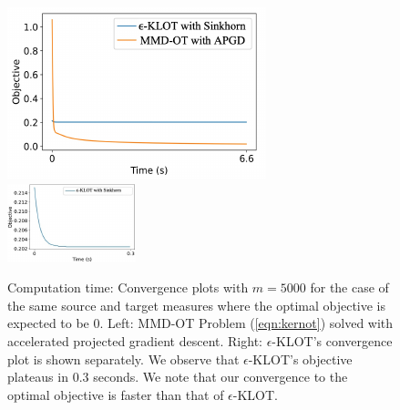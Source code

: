 \begin{figure}[t]
    \centering \includegraphics[width=0.47\linewidth]{chapter-1/images/synth3.pdf}\includegraphics[width=0.5\linewidth]{chapter-1/images/time.pdf}
    \caption{Computation time: Convergence plots with $m=5000$ for the case of the same source and target measures where the optimal objective is expected to be 0. Left: MMD-OT Problem (\ref{eqn:kernot}) solved with accelerated projected gradient descent. Right: $\epsilon$-KLOT's convergence plot is shown separately. We observe that $\epsilon$-KLOT's objective plateaus in 0.3 seconds. We note that our convergence to the optimal objective is faster than that of $\epsilon$-KLOT.}
    \label{time-supp}
\end{figure}
